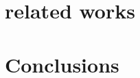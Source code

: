 \documentclass{sig-alternate}
\begin{document}
\section{related works}


\section{Conclusions}




%

%
%
%
\end{document}
